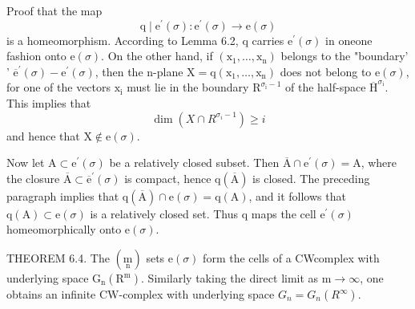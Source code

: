 \documentclass[10pt]{article}
\begin{document}
Proof that the map
$$
\mathrm{q} \mid \mathrm{e}^{\prime}(\sigma): \mathrm{e}^{\prime}(\sigma) \rightarrow \mathrm{e}(\sigma)
$$
is a homeomorphism. According to Lemma 6.2, q carries $\mathrm{e}^{\prime}(\sigma)$ in oneone fashion onto $\mathrm{e}(\sigma)$. On the other hand, if $\left(\mathrm{x}_{1}, \ldots, \mathrm{x}_{\mathrm{n}}\right)$ belongs to the "boundary' ' $\overline{\mathrm{e}}^{\prime}(\sigma)-\mathrm{e}^{\prime}(\sigma)$, then the $\mathrm{n}$-plane $\mathrm{X}=\mathrm{q}\left(\mathrm{x}_{1}, \ldots, \mathrm{x}_{\mathrm{n}}\right)$ does not belong to $\mathrm{e}(\sigma)$, for one of the vectors $\mathrm{x}_{\mathrm{i}}$ must lie in the boundary $\mathrm{R}^{\sigma_{\mathrm{i}}-1}$ of the half-space $\overline{\mathrm{H}}^{\sigma_{\mathrm{i}}}$. This implies that
$$
\operatorname{dim}\left(X \cap R^{\sigma_{i}-1}\right) \geq i
$$
and hence that $\mathrm{X} \notin \mathrm{e}(\sigma)$.

Now let $\mathrm{A} \subset \mathrm{e}^{\prime}(\sigma)$ be a relatively closed subset. Then $\overline{\mathrm{A}} \cap \mathrm{e}^{\prime}(\sigma)=\mathrm{A}$, where the closure $\overline{\mathrm{A}} \subset \overline{\mathrm{e}}^{\prime}(\sigma)$ is compact, hence $\mathrm{q}(\overline{\mathrm{A}})$ is closed. The preceding paragraph implies that $\mathrm{q}(\overline{\mathrm{A}}) \cap \mathrm{e}(\sigma)=\mathrm{q}(\mathrm{A})$, and it follows that $\mathrm{q}(\mathrm{A}) \subset \mathrm{e}(\sigma)$ is a relatively closed set. Thus $\mathrm{q}$ maps the cell $\mathrm{e}^{\prime}(\sigma)$ homeomorphically onto $\mathrm{e}(\sigma)$.

THEOREM 6.4. The $(\underset{\mathrm{n}}{\mathrm{m}})$ sets $\mathrm{e}(\sigma)$ form the cells of a CWcomplex with underlying space $\mathrm{G}_{\mathrm{n}}\left(\mathrm{R}^{\mathrm{m}}\right)$. Similarly taking the direct limit as $\mathrm{m} \rightarrow \infty$, one obtains an infinite $\mathrm{CW}$-complex with underlying space $G_{n}=G_{n}\left(R^{\infty}\right)$.
\end{document}
